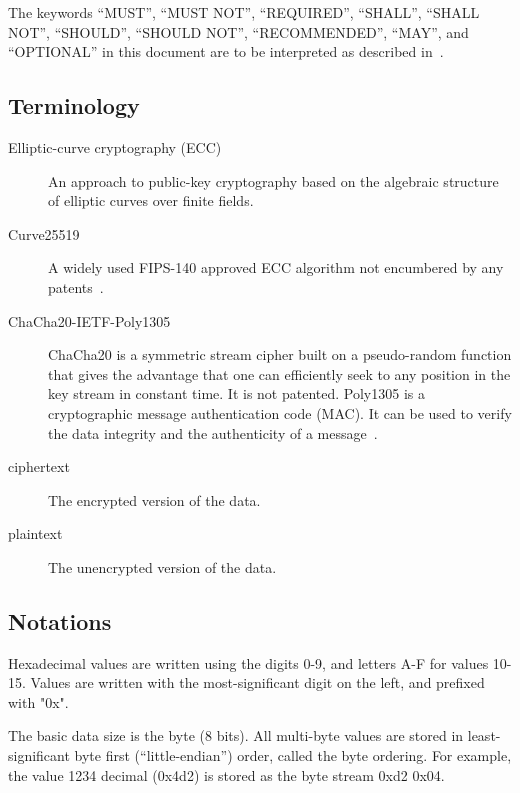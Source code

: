 The keywords ``MUST'', ``MUST NOT'', ``REQUIRED'', ``SHALL'', ``SHALL NOT'', ``SHOULD'', ``SHOULD NOT'', ``RECOMMENDED'', ``MAY'', and ``OPTIONAL'' in this document are to be interpreted as described in~\cite{RFC2119}.

\subsection{Terminology}

\begin{description}
\item[Elliptic-curve cryptography (ECC)] %
  An approach to public-key cryptography based on the algebraic structure of elliptic curves over finite fields.
\item[Curve25519] %
  A widely used FIPS-140 approved ECC algorithm not encumbered by any patents~\cite{RFC7748}.
\item[ChaCha20-IETF-Poly1305] %
  ChaCha20 is a symmetric stream cipher built on a pseudo-random function that gives the advantage that one can efficiently seek to any position in the key stream in constant time.
  It is not patented.
  Poly1305 is a cryptographic message authentication code (MAC).
  It can be used to verify the data integrity and the authenticity of a message~\cite{RFC8439}.
\item[ciphertext] %
  The encrypted version of the data.
\item[plaintext] %
  The unencrypted version of the data.
\end{description}

\subsection{Notations}

Hexadecimal values are written using the digits 0-9, and letters A-F for values 10-15.
%
Values are written with the most-significant digit on the left, and prefixed with "0x".

The basic data size is the byte (8 bits).
%
All multi-byte values are stored in least-significant byte first (``little-endian'') order, called the byte ordering.
%
For example, the value 1234 decimal (0x4d2) is stored as the byte stream 0xd2 0x04.


